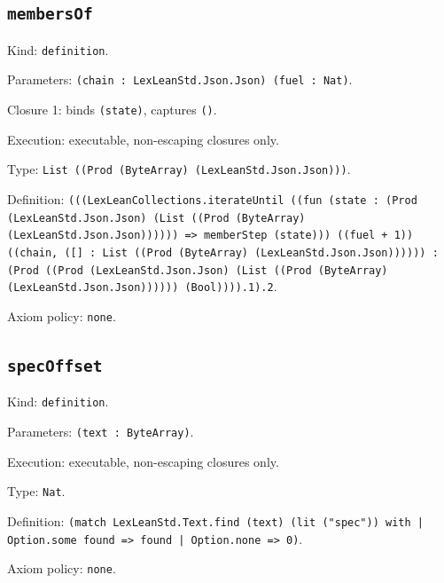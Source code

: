 \documentclass[11pt]{article}
\begin{document}
\subsection*{\texttt{membersOf}}
\noindent Kind: \texttt{definition}.\par
\noindent Parameters: \texttt{(chain : LexLeanStd.Json.Json) (fuel : Nat)}.\par
\noindent Closure 1: binds \texttt{(state)}, captures \texttt{()}.\par
\noindent Execution: executable, non-escaping closures only.\par
\noindent Type: \texttt{List ((Prod (ByteArray) (LexLeanStd.Json.Json)))}.\par
\noindent Definition: \texttt{(((LexLeanCollections.iterateUntil ((fun (state : (Prod (LexLeanStd.Json.Json) (List ((Prod (ByteArray) (LexLeanStd.Json.Json)))))) => memberStep (state))) ((fuel + 1)) ((chain, ([] : List ((Prod (ByteArray) (LexLeanStd.Json.Json)))))) : (Prod ((Prod (LexLeanStd.Json.Json) (List ((Prod (ByteArray) (LexLeanStd.Json.Json)))))) (Bool)))).1).2}.\par
\noindent Axiom policy: \texttt{none}.\par
\subsection*{\texttt{specOffset}}
\noindent Kind: \texttt{definition}.\par
\noindent Parameters: \texttt{(text : ByteArray)}.\par
\noindent Execution: executable, non-escaping closures only.\par
\noindent Type: \texttt{Nat}.\par
\noindent Definition: \texttt{(match LexLeanStd.Text.find (text) (lit ("spec")) with | Option.some found => found | Option.none => 0)}.\par
\noindent Axiom policy: \texttt{none}.\par
\end{document}
